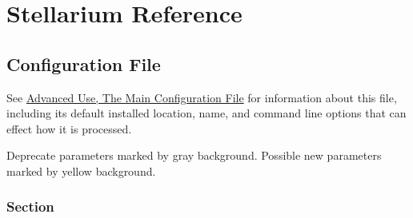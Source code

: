 
\chapter{Stellarium Reference}\label{stellarium-reference}

\section{Configuration File}\label{configuration-file}
See \href{Advanced_Use\#The_Main_Configuration_File}{Advanced Use, The
Main Configuration File} for information about this file, including its
default installed location, name, and command line options that can
effect how it is processed.

Deprecate parameters marked by gray background. Possible new parameters
marked by yellow background.

\subsection{Section }\label{section-astro}

